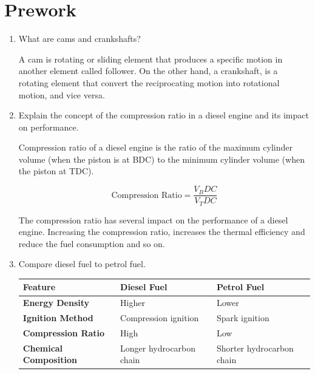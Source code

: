 \section{Prework}

\begin{enumerate}

	\item What are cams and crankshafts?

	      A cam is rotating or sliding element that produces a specific motion in another element called follower. On the other hand, a crankshaft, is a rotating element that convert the reciprocating motion into rotational motion, and vice versa.

	\item Explain the concept of the compression ratio in a diesel engine and its impact on performance.

	      Compression ratio of a diesel engine is the ratio of the maximum cylinder volume (when the piston is at BDC) to the minimum cylinder volume (when the piston at TDC).

	      \begin{equation*}
		      \text{Compression Ratio} = \frac{V_BDC}{V_TDC}
	      \end{equation*}

	      The compression ratio has several impact on the performance of a diesel engine. Increasing the compression ratio, increases the thermal efficiency and reduce the fuel consumption and so on.

	\item Compare diesel fuel to petrol fuel.
	      \begin{center}
		      \begin{tabular} {|l|l|l|}
			      \hline
			      \textbf{Feature}              & \textbf{Diesel Fuel}     & \textbf{Petrol Fuel}      \\
			      \hline
			      \textbf{Energy Density}       & Higher                   & Lower                     \\
			      \textbf{Ignition Method}      & Compression ignition     & Spark ignition            \\
			      \textbf{Compression Ratio}    & High                     & Low                       \\
			      \textbf{Chemical Composition} & Longer hydrocarbon chain & Shorter hydrocarbon chain \\
			      \hline
		      \end{tabular}
	      \end{center}
\end{enumerate}
